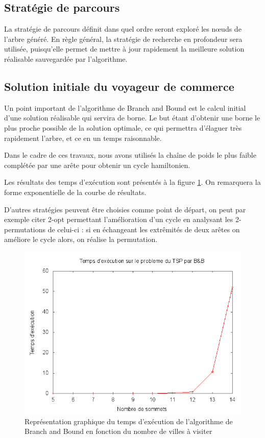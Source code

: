 \subsection{Stratégie de parcours}
La stratégie de parcours définit dans quel ordre seront exploré les n\oe uds de l'arbre généré. En
règle général, la stratégie de recherche en profondeur sera utilisée, puisqu'elle permet de mettre à
jour rapidement la meilleure solution réalisable sauvegardée par l'algorithme.


\subsection{Solution initiale du voyageur de commerce}

Un point important de l'algorithme de Branch and Bound est le calcul initial d'une solution
réalisable qui servira de borne. Le but étant d'obtenir une borne le plus proche possible de la
solution optimale, ce qui permettra d'élaguer très rapidement l'arbre, et ce en un temps
raisonnable.

Dans le cadre de ces travaux, nous avons utilisés la chaîne de poids le plus faible complétée par
une arête pour obtenir un cycle hamiltonien. 

Les résultats des temps d'exécution sont présentés à la figure \ref{tsp_chaine}. On remarquera la forme
exponentielle de la courbe de résultats.

D'autres stratégies peuvent être choisies comme point de départ, on peut par exemple citer 2-opt
permettant l'amélioration d'un cycle en analysant les 2-permutations de celui-ci : si en échangeant
les extrêmités de deux arêtes on améliore le cycle alors, on réalise la permutation.

\begin{figure}[H]
	\begin{center}
	\includegraphics[width=\linewidth]{../pratique/branch_and_bound_dev/tsp_bb.png}
\end{center}
\caption{Représentation graphique du temps d'exécution de l'algorithme de Branch and Bound en
fonction du nombre de villes à visiter}
\label{tsp_chaine}
\end{figure}

